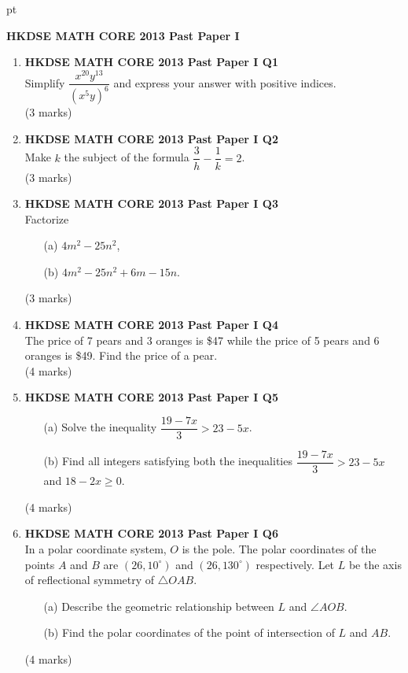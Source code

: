 \documentclass[12pt]{article}
\begin{document}
 pt
\begin{center}
	{\large \bf HKDSE MATH CORE 2013 Past Paper I}\\
	\vspace{2 mm}

\end{center}
\vspace{0.05cm}

\begin{enumerate}
	\item \textbf{HKDSE MATH CORE 2013 Past Paper I Q1}\\
	Simplify $\dfrac{x^{20}y^{13}}{(x^5y)^6}$ and express your answer with positive indices. \\(3 marks)	
	
	\item \textbf{HKDSE MATH CORE 2013 Past Paper I Q2}\\
	Make $k$ the subject of the formula $\dfrac{3}{h} - \dfrac{1}{k} = 2$. \\(3 marks)

	\item \textbf{HKDSE MATH CORE 2013 Past Paper I Q3}\\
	Factorize
	\begin{enumerate}
		\item [(a)] $4m^2 - 25n^2$,
		\item [(b)] $4m^2 - 25n^2 + 6m - 15n$.
	\end{enumerate}
	(3 marks)

	\item \textbf{HKDSE MATH CORE 2013 Past Paper I Q4}\\
	The price of 7 pears and 3 oranges is \$47 while the price of 5 pears and 6 oranges is \$49. Find the price of a pear. \\(4 marks)

	\item \textbf{HKDSE MATH CORE 2013 Past Paper I Q5}
	\begin{enumerate}
		\item[(a)] Solve the inequality $\dfrac{19-7x}{3} > 23-5x$.
		\item[(b)] Find all integers satisfying both the inequalities $\dfrac{19-7x}{3} > 23-5x$ and $18-2x \geq 0$.
	\end{enumerate}
	(4 marks)

	\item \textbf{HKDSE MATH CORE 2013 Past Paper I Q6}\\
	In a polar coordinate system, $O$ is the pole. The polar coordinates of the points $A$ and $B$ are $(26, 10^\circ)$ and $(26, 130^\circ)$ respectively. Let $L$ be the axis of reflectional symmetry of $\triangle OAB$.
	\begin{enumerate}
		\item[(a)] Describe the geometric relationship between $L$ and $\angle AOB$.
		\item[(b)] Find the polar coordinates of the point of intersection of $L$ and $AB$.		
	\end{enumerate}
	(4 marks)


\end{enumerate}
\end{document}
